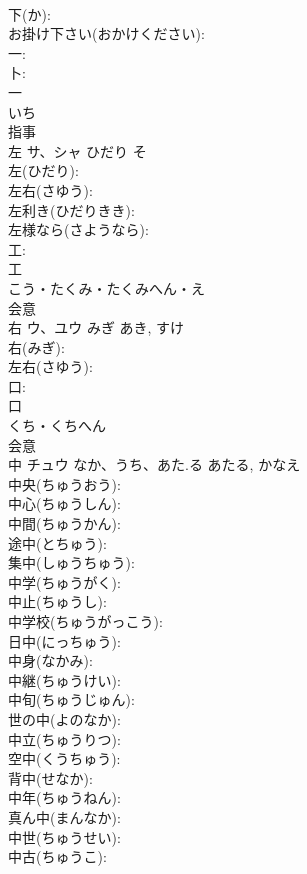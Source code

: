 \documentclass[8pt]{extreport}
\begin{document}
\begin{CJK}{UTF8}{min}
\\	下(か): 
\\	お掛け下さい(おかけください): 
\\	一: 
\\	卜: 
\\	一	
\\	いち	
\\	指事 
\\	左	サ、シャ	ひだり	そ	
\\	左(ひだり): 
\\	左右(さゆう): 
\\	左利き(ひだりきき): 
\\	左様なら(さようなら): 
\\	工: 
\\	工	
\\	こう・たくみ・たくみへん・え	
\\	会意 
\\	右	ウ、ユウ	みぎ	あき, すけ	
\\	右(みぎ): 
\\	左右(さゆう): 
\\	口: 
\\	口	
\\	くち・くちへん	
\\	会意 
\\	中	チュウ	なか、うち、あた.る	あたる, かなえ	
\\	中央(ちゅうおう): 
\\	中心(ちゅうしん): 
\\	中間(ちゅうかん): 
\\	途中(とちゅう): 
\\	集中(しゅうちゅう): 
\\	中学(ちゅうがく): 
\\	中止(ちゅうし): 
\\	中学校(ちゅうがっこう): 
\\	日中(にっちゅう): 
\\	中身(なかみ): 
\\	中継(ちゅうけい): 
\\	中旬(ちゅうじゅん): 
\\	世の中(よのなか): 
\\	中立(ちゅうりつ): 
\\	空中(くうちゅう): 
\\	背中(せなか): 
\\	中年(ちゅうねん): 
\\	真ん中(まんなか): 
\\	中世(ちゅうせい): 
\\	中古(ちゅうこ): 

\end{CJK}
\end{document}
